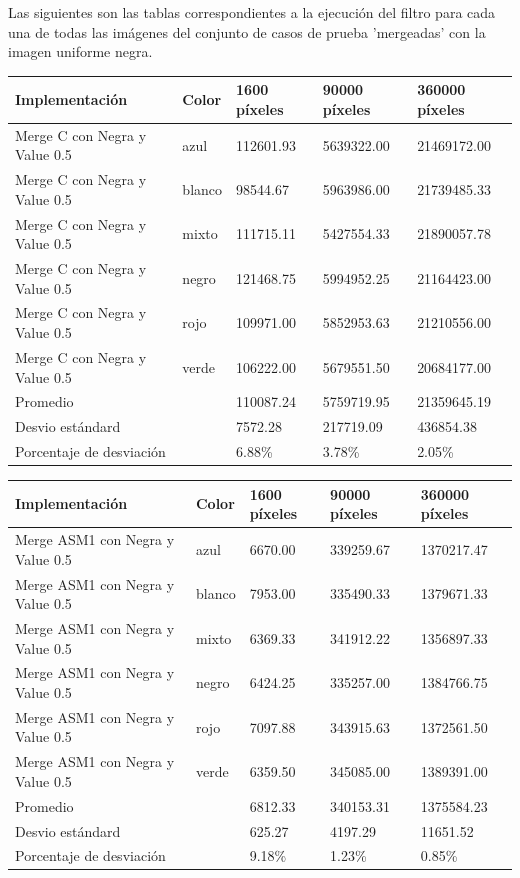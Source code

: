 Las siguientes son las tablas correspondientes a la ejecución del filtro para cada una de todas las imágenes del conjunto de casos de prueba 'mergeadas' con la imagen uniforme negra.

\begin{tabular}{| l | l | l | l | l |}
\hline
Implementación & Color & 1600 píxeles & 90000 píxeles & 360000 píxeles\\
\hline
Merge C con Negra y Value 0.5 & azul & 112601.93 &	5639322.00 &	21469172.00\\ 
\hline
Merge C con Negra y Value 0.5 & blanco & 98544.67	& 5963986.00 &	21739485.33\\ 
\hline
Merge C con Negra y Value 0.5 & mixto & 111715.11	& 5427554.33 &	21890057.78\\ 
\hline
Merge C con Negra y Value 0.5 & negro & 121468.75	& 5994952.25 &	21164423.00\\
\hline
Merge C con Negra y Value 0.5 & rojo & 109971.00	& 5852953.63	& 21210556.00\\
\hline
Merge C con Negra y Value 0.5 & verde & 106222.00 &	5679551.50	& 20684177.00\\ 
\hline
Promedio & &  110087.24	& 5759719.95 &	21359645.19\\
\hline
Desvio estándard  && 7572.28	& 217719.09	& 436854.38\\
\hline
Porcentaje de desviación  && 6.88\%	& 3.78\% &	2.05\%\\
\hline
\end{tabular}


\begin{tabular}{| l | l | l | l | l |}
\hline
Implementación & Color & 1600 píxeles & 90000 píxeles & 360000 píxeles\\
\hline
Merge ASM1 con Negra y Value 0.5 & azul & 6670.00 &	339259.67 &	1370217.47\\ 
\hline
Merge ASM1 con Negra y Value 0.5 & blanco & 7953.00 &	335490.33	& 1379671.33\\ 
\hline
Merge ASM1 con Negra y Value 0.5 & mixto & 6369.33	& 341912.22 &	1356897.33\\ 
\hline
Merge ASM1 con Negra y Value 0.5 & negro & 6424.25 &	335257.00 &	1384766.75\\
\hline
Merge ASM1 con Negra y Value 0.5 & rojo & 7097.88 &	343915.63 &	1372561.50\\
\hline
Merge ASM1 con Negra y Value 0.5 & verde & 6359.50	& 345085.00 &	1389391.00\\ 
\hline
Promedio & &  6812.33	& 340153.31 &	1375584.23\\
\hline
Desvio estándard  && 625.27	& 4197.29	& 11651.52\\
\hline
Porcentaje de desviación  && 9.18\% &	1.23\% &	0.85\%\\
\hline
\end{tabular}



